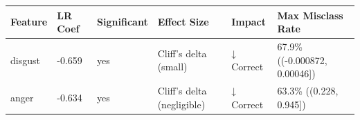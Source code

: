 \begin{tabular}{llllll}
\toprule
Feature & LR Coef & Significant & Effect Size & Impact & Max Misclass Rate \\
\midrule
disgust & -0.659 & yes & Cliff's delta (small) & ↓ Correct & 67.9\% ((-0.000872, 0.00046]) \\
anger & -0.634 & yes & Cliff's delta (negligible) & ↓ Correct & 63.3\% ((0.228, 0.945]) \\
\bottomrule
\end{tabular}
